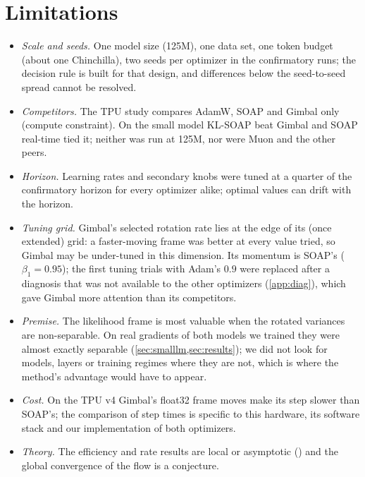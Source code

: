 \section{Limitations}
\label{sec:limitations}

\begin{itemize}[nosep,leftmargin=1.2em]
\item \emph{Scale and seeds.} One model size (125M), one data set, one token budget (about one
Chinchilla), two seeds per optimizer in the confirmatory runs; the decision rule is built for that
design, and differences below the seed-to-seed spread cannot be resolved.
\item \emph{Competitors.} The TPU study compares AdamW, SOAP and Gimbal only (compute constraint).
On the small model KL-SOAP beat Gimbal and SOAP real-time tied it; neither was run at 125M, nor were
Muon and the other peers.
\item \emph{Horizon.} Learning rates and secondary knobs were tuned at a quarter of the confirmatory
horizon for every optimizer alike; optimal values can drift with the horizon.
\item \emph{Tuning grid.} Gimbal's selected rotation rate lies at the edge of its (once extended)
grid: a faster-moving frame was better at every value tried, so Gimbal may be under-tuned in this
dimension. Its momentum is SOAP's ($\beta_1=0.95$); the first tuning trials with Adam's $0.9$ were
replaced after a diagnosis that was not available to the other optimizers (\cref{app:diag}),
which gave Gimbal more attention than its competitors.
\item \emph{Premise.} The likelihood frame is most valuable when the rotated variances are
non-separable. On real gradients of both models we trained they were almost exactly separable
(\cref{sec:smalllm,sec:results}); we did not look for models, layers or training regimes where
they are not, which is where the method's advantage would have to appear.
\item \emph{Cost.} On the TPU v4 Gimbal's float32 frame moves make its step slower than SOAP's; the
comparison of step times is specific to this hardware, its software stack and our implementation
of both optimizers.
\item \emph{Theory.} The efficiency and rate results are local or asymptotic () and the
global convergence of the flow is a conjecture.
\end{itemize}
